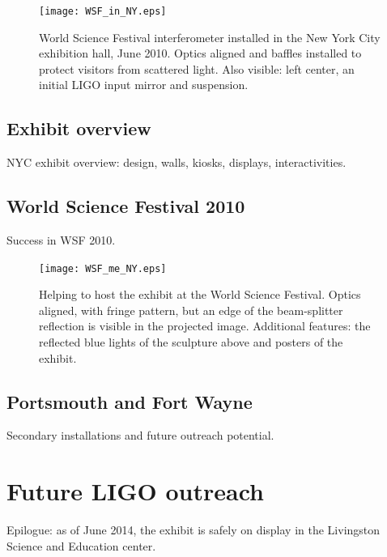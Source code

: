 	\begin{figure}
	\begin{center}
	\texttt{[image: WSF\_in\_NY.eps]}
	\caption{World Science Festival interferometer installed in the New York City exhibition hall, June 2010. Optics aligned and baffles installed to protect visitors from scattered light. Also visible: left center, an initial LIGO input mirror and suspension.}
	\label{WSF_IFO_photo}
	\end{center}
	\end{figure}


        \subsection{Exhibit overview}
        \label{exhibit_overview}

            NYC exhibit overview: design, walls, kiosks, displays, interactivities.

        \subsection{World Science Festival 2010}
        \label{WSF2010}

            Success in WSF 2010.

	\begin{figure}
	\begin{center}
	\texttt{[image: WSF\_me\_NY.eps]}
	\caption{Helping to host the exhibit at the World Science Festival. Optics aligned, with fringe pattern, but an edge of the beam-splitter reflection is visible in the projected image. Additional features: the reflected blue lights of the sculpture above and posters of the exhibit.}
	\label{WSF_IFO_me}
	\end{center}
	\end{figure}


        \subsection{Portsmouth and Fort Wayne}
        \label{secondary_installations}

            Secondary installations and future outreach potential.

    \section{Future LIGO outreach}
    \label{future_outreach}

        Epilogue: as of June 2014, the exhibit is safely on display in the Livingston Science and Education center.

